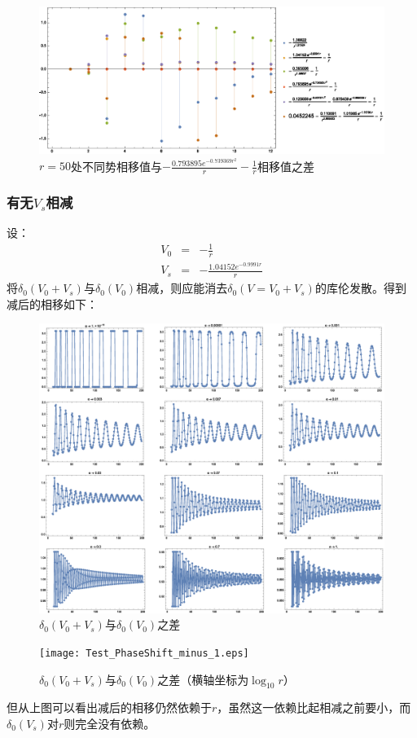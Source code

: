 \documentclass[hyperref,cs4size,titlepage,twoside]{ctexart}
\begin{document}
\begin{figure}[!hbtp]
  \centering
  \includegraphics[width=6in]{Test_PhaseShift_delta50comparasion_3.eps}
  \caption{$r=50$处不同势相移值与$\displaystyle-\frac{0.793895 e^{-0.739369 r^2}}{r}-\frac{1}{r}$相移值之差}
\end{figure}
\clearpage
\subsubsection{有无$V_s$相减}
设：
\begin{eqnarray}
  V_0 &=& -\frac{1}{r} \\
  V_s &=& -\frac{1.04152e^{-0.9991r}}{r}
\end{eqnarray}
将$\delta_0(V_0+V_s)$与$\delta_0(V_0)$相减，则应能消去$\delta_0(V=V_0+V_s)$的库伦发散。得到减后的相移如下：
\begin{figure}[!htpb]
  \centering
  \includegraphics[width=6.2in]{Test_PhaseShift_minus.eps}
  \caption{$\delta_0(V_0+V_s)$与$\delta_0(V_0)$之差}
\end{figure}
\clearpage
\begin{figure}[!htpb]
  \centering
  \texttt{[image: Test\_PhaseShift\_minus\_1.eps]}
\caption{$\delta_0(V_0+V_s)$与$\delta_0(V_0)$之差（横轴坐标为$\log_{10}r$）}
\end{figure}
但从上图可以看出减后的相移仍然依赖于$r$，虽然这一依赖比起相减之前要小，而$\delta_0(V_s)$对$r$则完全没有依赖。
\end{document}
